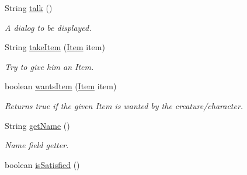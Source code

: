 \begin{DoxyCompactItemize}
String \hyperlink{classpkg__world_1_1pkg__characters_1_1Character_a8b6d62bb87460e19dc0e4561beb1ece1}{talk} ()
\begin{DoxyCompactList}\small\item\em A dialog to be displayed. \end{DoxyCompactList}\item 
String \hyperlink{classpkg__world_1_1pkg__characters_1_1Character_a0fb83fcff9b37c94eac3fb35868bebb2}{take\-Item} (\hyperlink{classpkg__world_1_1pkg__items_1_1Item}{Item} item)
\begin{DoxyCompactList}\small\item\em Try to give him an Item. \end{DoxyCompactList}\item 
boolean \hyperlink{classpkg__world_1_1pkg__characters_1_1Character_a816f8f79ef1e8c9635f0cdeb180b9f3f}{wants\-Item} (\hyperlink{classpkg__world_1_1pkg__items_1_1Item}{Item} item)
\begin{DoxyCompactList}\small\item\em Returns true if the given Item is wanted by the creature/character. \end{DoxyCompactList}\item 
String \hyperlink{classpkg__world_1_1pkg__characters_1_1Character_a660097e198e2e62f83d83a8872eb55d1}{get\-Name} ()
\begin{DoxyCompactList}\small\item\em Name field getter. \end{DoxyCompactList}\item 
boolean \hyperlink{classpkg__world_1_1pkg__characters_1_1Character_ae18c62b235802dd5bfacf662f0a1d17d}{is\-Satisfied} ()
\end{DoxyCompactItemize}
